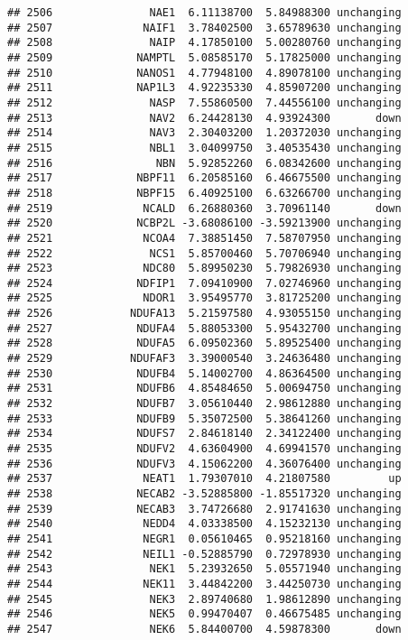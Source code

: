 \documentclass[]{article}
\begin{document}
\begin{verbatim}
## 2506               NAE1  6.11138700  5.84988300 unchanging
## 2507              NAIF1  3.78402500  3.65789630 unchanging
## 2508               NAIP  4.17850100  5.00280760 unchanging
## 2509             NAMPTL  5.08585170  5.17825000 unchanging
## 2510             NANOS1  4.77948100  4.89078100 unchanging
## 2511             NAP1L3  4.92235330  4.85907200 unchanging
## 2512               NASP  7.55860500  7.44556100 unchanging
## 2513               NAV2  6.24428130  4.93924300       down
## 2514               NAV3  2.30403200  1.20372030 unchanging
## 2515               NBL1  3.04099750  3.40535430 unchanging
## 2516                NBN  5.92852260  6.08342600 unchanging
## 2517             NBPF11  6.20585160  6.46675500 unchanging
## 2518             NBPF15  6.40925100  6.63266700 unchanging
## 2519              NCALD  6.26880360  3.70961140       down
## 2520             NCBP2L -3.68086100 -3.59213900 unchanging
## 2521              NCOA4  7.38851450  7.58707950 unchanging
## 2522               NCS1  5.85700460  5.70706940 unchanging
## 2523              NDC80  5.89950230  5.79826930 unchanging
## 2524             NDFIP1  7.09410900  7.02746960 unchanging
## 2525              NDOR1  3.95495770  3.81725200 unchanging
## 2526            NDUFA13  5.21597580  4.93055150 unchanging
## 2527             NDUFA4  5.88053300  5.95432700 unchanging
## 2528             NDUFA5  6.09502360  5.89525400 unchanging
## 2529            NDUFAF3  3.39000540  3.24636480 unchanging
## 2530             NDUFB4  5.14002700  4.86364500 unchanging
## 2531             NDUFB6  4.85484650  5.00694750 unchanging
## 2532             NDUFB7  3.05610440  2.98612880 unchanging
## 2533             NDUFB9  5.35072500  5.38641260 unchanging
## 2534             NDUFS7  2.84618140  2.34122400 unchanging
## 2535             NDUFV2  4.63604900  4.69941570 unchanging
## 2536             NDUFV3  4.15062200  4.36076400 unchanging
## 2537              NEAT1  1.79307010  4.21807580         up
## 2538             NECAB2 -3.52885800 -1.85517320 unchanging
## 2539             NECAB3  3.74726680  2.91741630 unchanging
## 2540              NEDD4  4.03338500  4.15232130 unchanging
## 2541              NEGR1  0.05610465  0.95218160 unchanging
## 2542              NEIL1 -0.52885790  0.72978930 unchanging
## 2543               NEK1  5.23932650  5.05571940 unchanging
## 2544              NEK11  3.44842200  3.44250730 unchanging
## 2545               NEK3  2.89740680  1.98612890 unchanging
## 2546               NEK5  0.99470407  0.46675485 unchanging
## 2547               NEK6  5.84400700  4.59878300       down

\end{verbatim}
\end{document}
